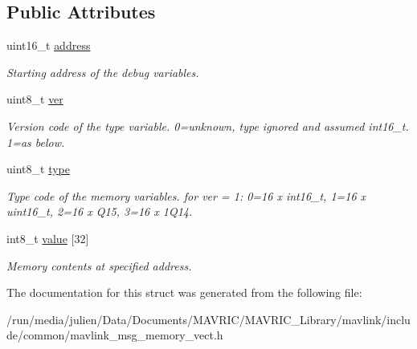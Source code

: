 \subsection*{Public Attributes}
\begin{DoxyCompactItemize}
\item 
\hypertarget{struct____mavlink__memory__vect__t_a079a0cecfd6f6e3d47c4c1d324ddd29d}{uint16\+\_\+t \hyperlink{struct____mavlink__memory__vect__t_a079a0cecfd6f6e3d47c4c1d324ddd29d}{address}}\label{struct____mavlink__memory__vect__t_a079a0cecfd6f6e3d47c4c1d324ddd29d}

\begin{DoxyCompactList}\small\item\em Starting address of the debug variables. \end{DoxyCompactList}\item 
\hypertarget{struct____mavlink__memory__vect__t_acb180cded1d3dcbf3e719545b50f392e}{uint8\+\_\+t \hyperlink{struct____mavlink__memory__vect__t_acb180cded1d3dcbf3e719545b50f392e}{ver}}\label{struct____mavlink__memory__vect__t_acb180cded1d3dcbf3e719545b50f392e}

\begin{DoxyCompactList}\small\item\em Version code of the type variable. 0=unknown, type ignored and assumed int16\+\_\+t. 1=as below. \end{DoxyCompactList}\item 
\hypertarget{struct____mavlink__memory__vect__t_a5c37b4f5d396209693c7bb32097a6e88}{uint8\+\_\+t \hyperlink{struct____mavlink__memory__vect__t_a5c37b4f5d396209693c7bb32097a6e88}{type}}\label{struct____mavlink__memory__vect__t_a5c37b4f5d396209693c7bb32097a6e88}

\begin{DoxyCompactList}\small\item\em Type code of the memory variables. for ver = 1\+: 0=16 x int16\+\_\+t, 1=16 x uint16\+\_\+t, 2=16 x Q15, 3=16 x 1\+Q14. \end{DoxyCompactList}\item 
\hypertarget{struct____mavlink__memory__vect__t_aa4c3207a3dbc0e0a3b821b90740ad4e6}{int8\+\_\+t \hyperlink{struct____mavlink__memory__vect__t_aa4c3207a3dbc0e0a3b821b90740ad4e6}{value} \mbox{[}32\mbox{]}}\label{struct____mavlink__memory__vect__t_aa4c3207a3dbc0e0a3b821b90740ad4e6}

\begin{DoxyCompactList}\small\item\em Memory contents at specified address. \end{DoxyCompactList}\end{DoxyCompactItemize}


The documentation for this struct was generated from the following file\+:\begin{DoxyCompactItemize}
\item 
/run/media/julien/\+Data/\+Documents/\+M\+A\+V\+R\+I\+C/\+M\+A\+V\+R\+I\+C\+\_\+\+Library/mavlink/include/common/mavlink\+\_\+msg\+\_\+memory\+\_\+vect.\+h\end{DoxyCompactItemize}
